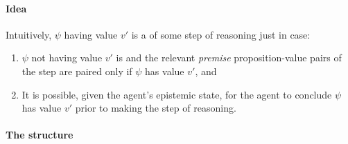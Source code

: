 \paragraph{Idea}

\begin{note}
  Intuitively, \(\psi\) having value \(v'\) is a \prequ{} of some step of reasoning just in case:
  \begin{enumerate}[label=\arabic*., ref=(\arabic*)]
  \item
    \label{prequ:int:structure}
    \(\psi\) not having value \(v'\) is \epVAd{} and the relevant \emph{premise} proposition-value pairs of the step are paired only if \(\psi\) has value \(v'\), and
  \item
    \label{prequ:int:reasoning}
    It is possible, given the agent's epistemic state, for the agent to conclude \(\psi\) has value \(v'\) prior to making the step of reasoning.
  \end{enumerate}
\end{note}

\paragraph{The structure}

